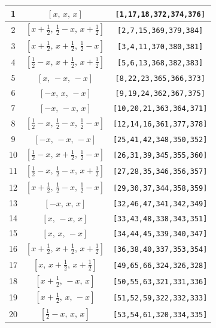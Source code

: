 \documentclass[fleqn,8pt]{jsarticle}
\begin{document}
\begin{longtable}{ccc}
1 & $\left[ x,\, x,\, x \right]$ & {\tt [1,17,18,372,374,376]} \\ \hline
2 & $\left[ x + \frac{1}{2},\, \frac{1}{2} - x,\, x + \frac{1}{2} \right]$ & {\tt [2,7,15,369,379,384]} \\ \hline
3 & $\left[ x + \frac{1}{2},\, x + \frac{1}{2},\, \frac{1}{2} - x \right]$ & {\tt [3,4,11,370,380,381]} \\ \hline
4 & $\left[ \frac{1}{2} - x,\, x + \frac{1}{2},\, x + \frac{1}{2} \right]$ & {\tt [5,6,13,368,382,383]} \\ \hline
5 & $\left[ x,\, - x,\, - x \right]$ & {\tt [8,22,23,365,366,373]} \\ \hline
6 & $\left[ - x,\, x,\, - x \right]$ & {\tt [9,19,24,362,367,375]} \\ \hline
7 & $\left[ - x,\, - x,\, x \right]$ & {\tt [10,20,21,363,364,371]} \\ \hline
8 & $\left[ \frac{1}{2} - x,\, \frac{1}{2} - x,\, \frac{1}{2} - x \right]$ & {\tt [12,14,16,361,377,378]} \\ \hline
9 & $\left[ - x,\, - x,\, - x \right]$ & {\tt [25,41,42,348,350,352]} \\ \hline
10 & $\left[ \frac{1}{2} - x,\, x + \frac{1}{2},\, \frac{1}{2} - x \right]$ & {\tt [26,31,39,345,355,360]} \\ \hline
11 & $\left[ \frac{1}{2} - x,\, \frac{1}{2} - x,\, x + \frac{1}{2} \right]$ & {\tt [27,28,35,346,356,357]} \\ \hline
12 & $\left[ x + \frac{1}{2},\, \frac{1}{2} - x,\, \frac{1}{2} - x \right]$ & {\tt [29,30,37,344,358,359]} \\ \hline
13 & $\left[ - x,\, x,\, x \right]$ & {\tt [32,46,47,341,342,349]} \\ \hline
14 & $\left[ x,\, - x,\, x \right]$ & {\tt [33,43,48,338,343,351]} \\ \hline
15 & $\left[ x,\, x,\, - x \right]$ & {\tt [34,44,45,339,340,347]} \\ \hline
16 & $\left[ x + \frac{1}{2},\, x + \frac{1}{2},\, x + \frac{1}{2} \right]$ & {\tt [36,38,40,337,353,354]} \\ \hline
17 & $\left[ x,\, x + \frac{1}{2},\, x + \frac{1}{2} \right]$ & {\tt [49,65,66,324,326,328]} \\ \hline
18 & $\left[ x + \frac{1}{2},\, - x,\, x \right]$ & {\tt [50,55,63,321,331,336]} \\ \hline
19 & $\left[ x + \frac{1}{2},\, x,\, - x \right]$ & {\tt [51,52,59,322,332,333]} \\ \hline
20 & $\left[ \frac{1}{2} - x,\, x,\, x \right]$ & {\tt [53,54,61,320,334,335]} \\ \hline

\end{longtable}
\end{document}
